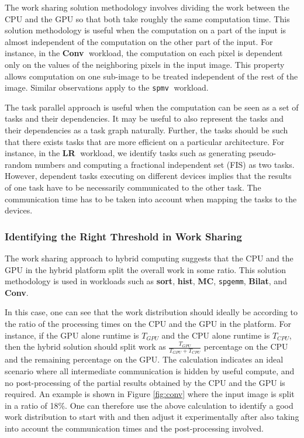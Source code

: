 \documentclass[11pt]{article}
\newcommand{\sgemm} {{\tt spgemm}}
\newcommand{\spmv} {{\tt spmv}}
\newcommand{\bilat} {{\bf Bilat}}
\newcommand{\conv} {{\bf Conv}}
\newcommand{\hist} {{\bf hist}}
\newcommand{\sort} {{\bf sort}}
\newcommand{\LR} {{\bf LR}}
\newcommand{\MC} {{\bf MC}}
\begin{document}
The work sharing solution methodology involves dividing the work between
the CPU and the GPU so that both take roughly the same computation time. 
This solution methodology is useful when the computation on a part of the
input is almost independent of the computation on the other part of the
input. For instance, in the \conv$\;$ workload, the computation on each pixel
is dependent only on the values of the neighboring pixels in the input
image. This property allows computation on one sub-image to be treated
independent of the rest of the image. Similar observations apply to the
\spmv$\;$ workload. 


The task parallel approach is useful when the computation can be seen as
a set of tasks and their dependencies. It may be useful to also
represent the tasks and their dependencies as a task graph naturally.
Further, the tasks should be such that there exists tasks that are more
efficient on a particular architecture. For instance, in the \LR$\;$
workload, we identify tasks such as generating pseudo-random numbers and
computing a fractional independent set (FIS) as two tasks. However,
dependent tasks executing on different devices implies that the results
of one task have to be necessarily communicated to the other task. The
communication time has to be taken into account when mapping the tasks
to the devices.

\subsubsection{Identifying the Right Threshold in Work Sharing} 
The work sharing approach to hybrid computing
suggests that the CPU and the GPU in the hybrid platform split the
overall work in some ratio. This solution methodology is used in
workloads such as \sort, \hist, \MC, \sgemm, \bilat, and \conv. 

In this case, one can see that the work
distribution should ideally be according to the ratio of the 
processing times on the CPU and the GPU in the platform. For instance, if the
GPU alone runtime is $T_{GPU}$ and the CPU alone runtime is
$T_{CPU}$, then the hybrid solution should split work as
$\frac{T_{GPU}}{T_{GPU}+T_{CPU}}$ percentage on the CPU and the
remaining percentage on the GPU. The calculation indicates an ideal
scenario where all intermediate communication is hidden by useful
compute, and no post-processing of the partial results obtained by the
CPU and the GPU is required. An example is shown in Figure \ref{fig:conv}
where the input image is split in a ratio of 18\%.
One can therefore use the above calculation to identify a good work
distribution to start with and then 
adjust it experimentally after also taking into account the communication
times and the post-processing involved. 
\end{document}

